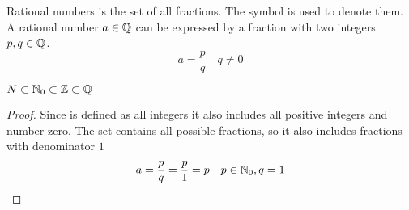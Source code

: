 \begin{definition}
    Rational numbers is the set of all fractions.
    The symbol \Q{} is used to denote them.
    A rational number $a \in \mathbb{Q}$ can be expressed by a fraction with 
    two integers $p,q \in \mathbb{Q}$.
    \begin{equation}
        a = \frac{p}{q} \quad q \ne 0
    \end{equation}
\end{definition}

\begin{lemma}
    $N \subset \mathbb{N}_0 \subset \mathbb{Z} \subset \mathbb{Q}$
\end{lemma}
\begin{proof}
    Since \Z{} is defined as all integers it also includes all positive integers \N{} and 
    number zero.
    The set \Q{} contains all possible fractions, so it also includes fractions with denominator $1$
    \begin{equation}
        a = \frac{p}{q} = \frac{p}{1} = p \quad p \in \mathbb{N}_0, q = 1
    \end{equation}
\end{proof}

